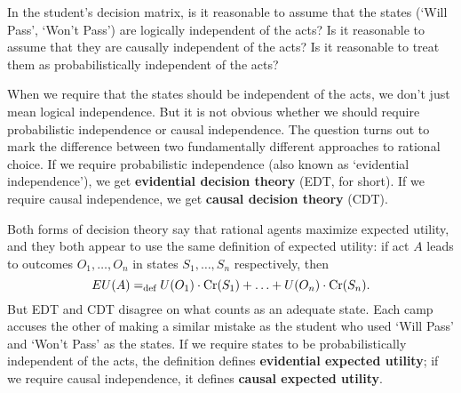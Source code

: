 \begin{exercise1}
  In the student's decision matrix, is it reasonable to assume that the states
  (`Will Pass', `Won't Pass') are logically independent of the acts? Is it
  reasonable to assume that they are causally independent of the acts? Is it
  reasonable to treat them as probabilistically independent of the acts?
\end{exercise1}

When we require that the states should be independent of the acts, we
don't just mean logical independence. But it is not obvious whether we
should require probabilistic independence or causal independence.
The question turns out to mark the difference between two fundamentally
different approaches to rational choice. If we require probabilistic
independence (also known as `evidential independence'), we get
\textbf{evidential decision theory} (EDT, for short). If we require causal
independence, we get \textbf{causal decision theory} (CDT).

Both forms of decision theory say that rational agents maximize
expected utility, and they both appear to use the same definition of
expected utility: if act $A$ leads to outcomes $O_1,\ldots,O_n$
in states $S_1,\ldots,S_n$ respectively, then
\[
EU(A) =_\text{def} U(O_1) \cdot \text{Cr}(S_1) + \ldots + U(O_n) \cdot \text{Cr}(S_n).
\]
But EDT and CDT disagree on what counts as an adequate state. Each
camp accuses the other of making a similar mistake as the student who
used `Will Pass' and `Won't Pass' as the states. If we require states
to be probabilistically independent of the acts, the definition
defines \textbf{evidential expected utility}; if we require causal
independence, it defines \textbf{causal expected utility}.


